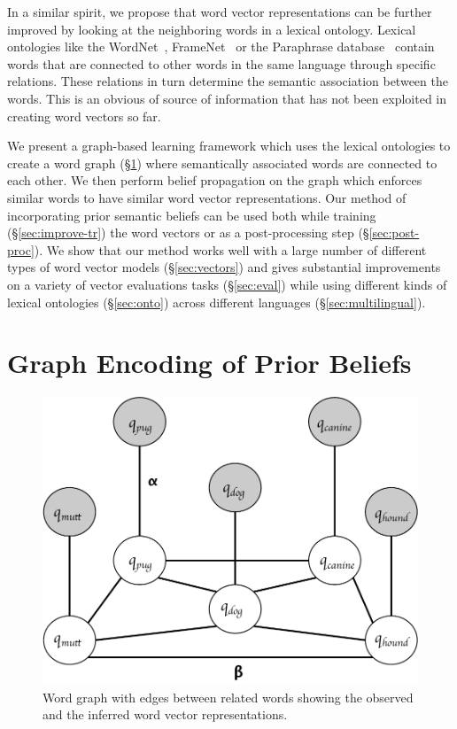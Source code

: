 \documentclass[11pt]{article}
\begin{document}
In a similar spirit, we propose that
word vector representations can be further improved by looking at the neighboring words
in a lexical ontology. Lexical ontologies like the WordNet~\cite{miller:1995}, 
FrameNet~\cite{Baker:1998:BFP:980845.980860} or the Paraphrase 
database~\cite{ganitkevitch2013ppdb} contain words that are connected to other words in 
the same language through specific relations. These relations in turn determine the semantic
association between the words. This is an obvious of source of information that has not been
exploited in creating word vectors so far. 

We present a graph-based learning framework which
uses the lexical ontologies to create a word graph (\S\ref{sec:graph}) where semantically associated words
are connected to each other. We then perform belief propagation on the graph which enforces
similar words to have similar word vector representations. Our method of incorporating prior
semantic beliefs can be used both while training (\S\ref{sec:improve-tr}) the word vectors or as a 
post-processing step (\S\ref{sec:post-proc}). 
We show that our method works well with a large number of 
different types of word vector models (\S\ref{sec:vectors}) and gives substantial improvements on a 
variety of vector evaluations tasks (\S\ref{sec:eval}) while using different kinds of lexical ontologies (\S\ref{sec:onto}) across different languages (\S\ref{sec:multilingual}).

\section{Graph Encoding of Prior Beliefs}
\label{sec:graph}

\begin{figure}[tb]
  \centering
  \includegraphics[width=\columnwidth]{diagram.pdf}
  \caption{Word graph with edges between related words showing the observed and the inferred word vector representations.}
  \label{fig:word-graph}
\end{figure}
\end{document}
